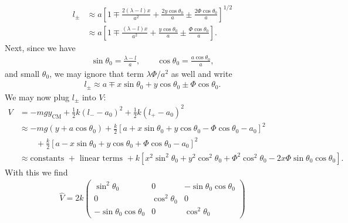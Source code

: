 \documentclass{article}
\theoremstyle{definition}
\newcommand{\f}[2]{\frac{#1}{#2}}
\newcommand{\lb}{\left[}
\newcommand{\rb}{\right]}
\begin{document}
\begin{enumerate}[label=(\alph*)]
	\begin{align*}
	l_\pm 
	&\approx a \lb 1 \mp \f{2(\lambda-l) x}{a^2} + \f{2y\cos\theta_0}{a} \pm \f{2\Phi \cos\theta_0}{a} \rb^{1/2}\\
	&\approx a\lb 1 \mp \f{(\lambda-l) x}{a^2}  + \f{y\cos\theta_0}{a} \pm \f{\Phi\cos\theta_0}{a} \rb.
	\end{align*}
	Next, since we have
	\begin{align*}
	\sin\theta_0 = \f{\lambda-l}{a}, \quad\quad \cos\theta_0 = \f{a\cos\theta_0}{a},
	\end{align*}
	and small $\theta_0$, we may ignore that term $\lambda\Phi/a^2$ as well and write
	\begin{align*}
	l_\pm \approx a \mp x \sin\theta_0 + y\cos\theta_0 \pm \Phi \cos\theta_0.
	\end{align*}
	We may now plug $l_\pm$ into $V$:
	\begin{align*}
	V 
	&= -mgy_\text{CM} + \f{1}{2}k(l_- -a_0)^2 + \f{1}{2}k(l_+-a_0)^2\\
	&\approx -mg(y+a\cos\theta_0) + \f{k}{2}\lb a + x \sin\theta_0 + y\cos\theta_0 - \Phi \cos\theta_0 -a_0 \rb^2\\
	&\quad\quad + \f{k}{2}\lb a - x \sin\theta_0 + y\cos\theta_0 + \Phi \cos\theta_0 - a_0\rb^2\\
	&\approx \text{constants } + \text{ linear terms } + k\lb x^2\sin^2\theta_0 + y^2\cos^2\theta_0
	+ \Phi^2\cos^2\theta_0 - 2x\Phi \sin\theta_0\cos\theta_0\rb.
	\end{align*}
	With this we find 
	\begin{align*}
	\boxed{\hat V = 
	2k\begin{pmatrix}
	\sin^2\theta_0 & 0 & -\sin\theta_0 \cos\theta_0 \\
	0 & \cos^2\theta_0 & 0  \\
	-\sin\theta_0 \cos\theta_0 & 0 & \cos^2\theta_0
	\end{pmatrix}}
	\end{align*}
	
	
	
	
	
	
	

\end{enumerate}
\end{document}
